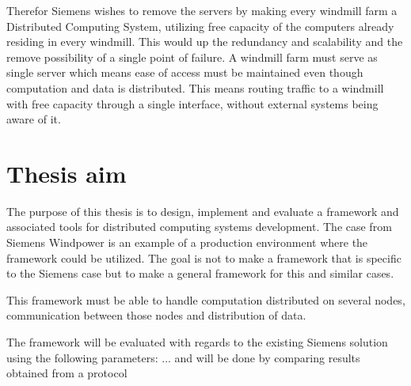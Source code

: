 Therefor Siemens wishes to remove the servers by making every windmill farm a Distributed Computing System, utilizing free capacity of the computers already residing in every windmill. This would up the redundancy and scalability and the remove possibility of a single point of failure. A windmill farm must serve as single server which means ease of access must be maintained even though computation and data is distributed. This means routing traffic to a windmill with free capacity through a single interface, without external systems being aware of it.


\section{Thesis aim}

The purpose of this thesis is to design, implement and evaluate a framework and associated tools for distributed computing systems development. The case from Siemens Windpower is an example of a production environment where the framework could be utilized. The goal is not to make a framework that is specific to the Siemens case but to make a general framework for this and similar cases. 

This framework must be able to handle computation distributed on several nodes, communication between those nodes and distribution of data. 

The framework will be evaluated with regards to the existing Siemens solution using the following parameters: ... and will be done by comparing results obtained from a protocol 


